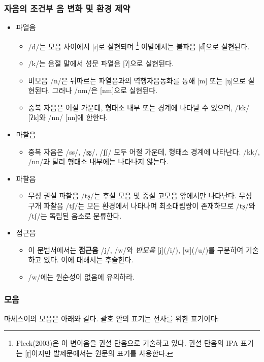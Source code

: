 \subsubsection{자음의 조건부 음 변화 및 환경 제약}
\begin{itemize}
\item 파열음
	\begin{itemize}
	\item /d/는 모음 사이에서 [ɾ]로 실현되며
		\footnote{Fleck(2003)은 이 변이음을 권설 탄음으로 기술하고 있다. 권설 탄음의 IPA 표기는 [ɽ]이지만 발제문에서는 원문의 표기를 사용한다.}
		어말에서는 불파음 [d̚]으로 실현된다. 
	\item /k/는 음절 말에서 성문 파열음 [ʔ]으로 실현된다.
	\item 비모음 /n/은 뒤따르는 파열음과의 역행자음동화를 통해 [m] 또는 [ŋ]으로 실현된다. 그러나 /nm/은 [nm]으로 실현된다. 
	\item 중복 자음은 어절 가운데, 형태소 내부 또는 경계에 나타날 수 있으며, /kk/ [ʔk]와 /nn/ [nn]에 한한다. 
	\end{itemize}
\item 마찰음
	\begin{itemize}
	\item 중복 자음은 /ss/, /ʂʂ/, /ʃʃ/ 모두 어절 가운데, 형태소 경계에 나타난다. /kk/, /nn/과 달리 형태소 내부에는 나타나지 않는다. 
	\end{itemize}
\item 파찰음
	\begin{itemize}
	\item 무성 권설 파찰음 /tʂ/는 후설 모음 및 중설 고모음 앞에서만 나타난다. 무성 구개 파찰음 /tʃ/는 모든 환경에서 나타나며 최소대립쌍이 존재하므로 /tʂ/와 /tʃ/는 독립된 음소로 분류한다. 
	\end{itemize}
\item 접근음
	\begin{itemize}
	\item 이 문법서에서는 \textbf{접근음} /j/, /w/와 \textit{반모음} [j](/i/), [w](/u/)를 구분하여 기술하고 있다. 이에 대해서는 후술한다. 
	\item /w/에는 원순성이 없음에 유의하라. 
	\end{itemize}
\end{itemize}

\subsubsection{모음}
마체스어의 모음은 아래와 같다. 괄호 안의 표기는 전사를 위한 표기이다:  

